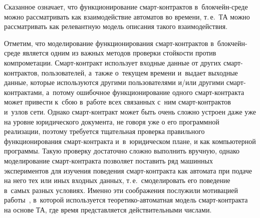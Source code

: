 \begin{multicols}{2}
Сказанное означает, что функционирование смарт-кон\-трак\-тов в~блок\-чейн-сре\-де можно
рас\-смат\-ри\-вать как взаимодействие автоматов во времени,  т.\,е.\ ТА можно рассматривать
как релевантную модель  описания такого взаимодействия.

Отметим, что  моделирование функционирования смарт-кон\-трак\-тов в~блок\-чейн-сре\-де 
является одним из важных методов проверки стойкости  против компрометации. 
Смарт-кон\-тракт использует входные данные от других смарт-кон\-трак\-тов,
пользователей, а~также о~текущем времени и~выдает  выходные данные, которые
используются другими пользователями и/или другими смарт-кон\-трак\-та\-ми, а~потому
ошибочное функционирование одного смарт-кон\-трак\-та может привести к~сбою 
в~работе всех связанных с~ним смарт-кон\-трак\-тов и~узлов сети. Однако смарт-кон\-тракт
может быть очень сложно устроен даже уже на уровне юридического документа,
не говоря уже о его программной реализации, поэтому требуется тщательная
проверка правильного функционирования смарт-кон\-трак\-та\linebreak
 и~в~юридическом плане,
и как компьютерной программы. Такую проверку достаточно сложно выполнить
вручную, однако моделирование смарт-кон\-трак\-та позволяет поставить ряд машинных\linebreak
экспериментов для изучения поведения смарт-кон\-трак\-та как автомата при подаче
на него тех или иных входных данных, т.\,е.\ смоделировать его поведение в~самых
разных условиях. Именно эти соображения послужили мотивацией
 работы~\cite{Bitcoin-contract-model}, в~которой используется 
 тео\-ре\-ти\-ко-ав\-то\-мат\-ная модель
смарт-кон\-трак\-та на основе ТА, где время представляется действительными чис\-лами.




\end{multicols}
